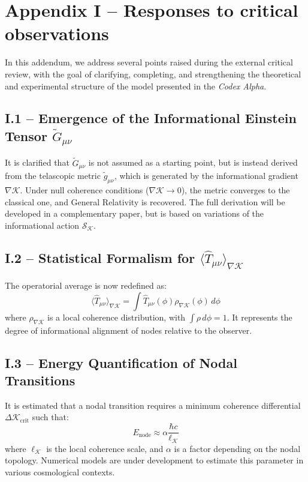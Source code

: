 \documentclass[12pt]{article}
\begin{document}
\section*{Appendix I – Responses to critical observations}
In this addendum, we address several points raised during the external critical review, with the goal of clarifying, completing, and strengthening the theoretical and experimental structure of the model presented in the \textit{Codex Alpha}.

\subsection*{I.1 – Emergence of the Informational Einstein Tensor $\tilde{G}_{\mu\nu}$}

It is clarified that $\tilde{G}_{\mu\nu}$ is not assumed as a starting point, but is instead derived from the telascopic metric $\tilde{g}_{\mu\nu}$, which is generated by the informational gradient $\nabla \mathcal{K}$. Under null coherence conditions ($\nabla \mathcal{K} \to 0$), the metric converges to the classical one, and General Relativity is recovered. The full derivation will be developed in a complementary paper, but is based on variations of the informational action $\mathcal{S}_\mathcal{K}$.

\subsection*{I.2 – Statistical Formalism for $\langle \hat{T}_{\mu\nu} \rangle_{\nabla \mathcal{K}}$}

The operatorial average is now redefined as:
\[
\langle \hat{T}_{\mu\nu} \rangle_{\nabla \mathcal{K}} = \int \hat{T}_{\mu\nu}(\phi) \rho_{\nabla \mathcal{K}}(\phi) \, d\phi
\]
where $\rho_{\nabla \mathcal{K}}$ is a local coherence distribution, with $\int \rho \, d\phi = 1$. It represents the degree of informational alignment of nodes relative to the observer.

\subsection*{I.3 – Energy Quantification of Nodal Transitions}

It is estimated that a nodal transition requires a minimum coherence differential $\Delta \mathcal{K}_\text{crit}$ such that:
\[
E_\text{node} \approx \alpha \frac{\hbar c}{\ell_{\mathcal{K}}}
\]
where $\ell_{\mathcal{K}}$ is the local coherence scale, and $\alpha$ is a factor depending on the nodal topology. Numerical models are under development to estimate this parameter in various cosmological contexts.
\end{document}
